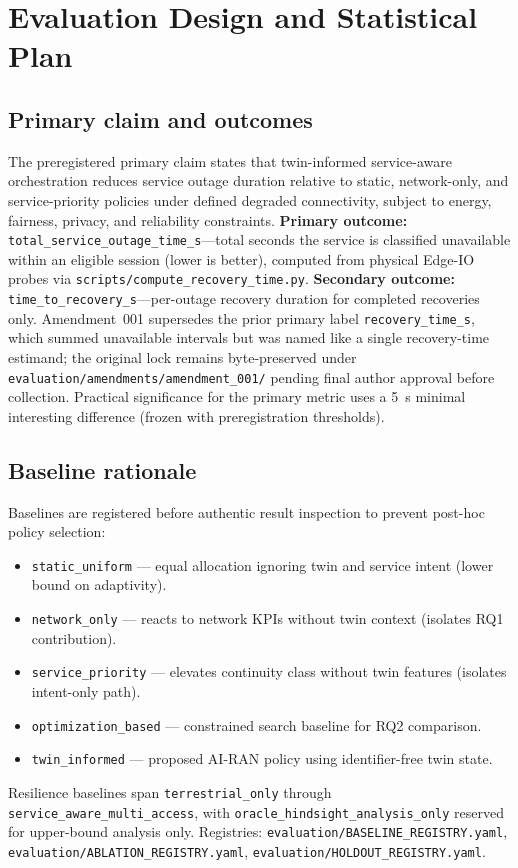 \section{Evaluation Design and Statistical Plan}
\label{sec:evaluation}

\subsection{Primary claim and outcomes}
The preregistered primary claim states that twin-informed service-aware orchestration reduces service outage duration relative to static, network-only, and service-priority policies under defined degraded connectivity, subject to energy, fairness, privacy, and reliability constraints.
\textbf{Primary outcome:} \texttt{total\_service\_outage\_time\_s}---total seconds the service is classified unavailable within an eligible session (lower is better), computed from physical Edge-IO probes via \texttt{scripts/compute\_recovery\_time.py}.
\textbf{Secondary outcome:} \texttt{time\_to\_recovery\_s}---per-outage recovery duration for completed recoveries only.
Amendment~001 supersedes the prior primary label \texttt{recovery\_time\_s}, which summed unavailable intervals but was named like a single recovery-time estimand; the original lock remains byte-preserved under \texttt{evaluation/amendments/amendment\_001/} pending final author approval before collection.
Practical significance for the primary metric uses a 5~s minimal interesting difference (frozen with preregistration thresholds).

\subsection{Baseline rationale}
Baselines are registered before authentic result inspection to prevent post-hoc policy selection:
\begin{itemize}
  \item \texttt{static\_uniform} --- equal allocation ignoring twin and service intent (lower bound on adaptivity).
  \item \texttt{network\_only} --- reacts to network KPIs without twin context (isolates RQ1 contribution).
  \item \texttt{service\_priority} --- elevates continuity class without twin features (isolates intent-only path).
  \item \texttt{optimization\_based} --- constrained search baseline for RQ2 comparison.
  \item \texttt{twin\_informed} --- proposed AI-RAN policy using identifier-free twin state.
\end{itemize}
Resilience baselines span \texttt{terrestrial\_only} through \texttt{service\_aware\_multi\_access}, with \texttt{oracle\_hindsight\_analysis\_only} reserved for upper-bound analysis only.
Registries: \texttt{evaluation/BASELINE\_REGISTRY.yaml}, \texttt{evaluation/ABLATION\_REGISTRY.yaml}, \texttt{evaluation/HOLDOUT\_REGISTRY.yaml}.

